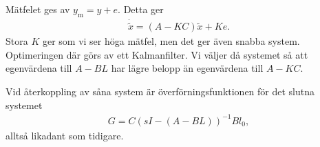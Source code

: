 Mätfelet ges av $y_{\text{m}} = y + e$. Detta ger
\begin{align*}
	\dot{\tilde{x}} = (A - KC)\tilde{x} + Ke.
\end{align*}
Stora $K$ ger som vi ser höga mätfel, men det ger även snabba system. Optimeringen där görs av ett Kalmanfilter. Vi väljer då systemet så att egenvärdena till $A - BL$ har lägre belopp än egenvärdena till $A - KC$.

Vid återkoppling av såna system är överförningsfunktionen för det slutna systemet
\begin{align*}
	G = C(sI - (A - BL))^{-1}Bl_{0},
\end{align*}
alltså likadant som tidigare.
